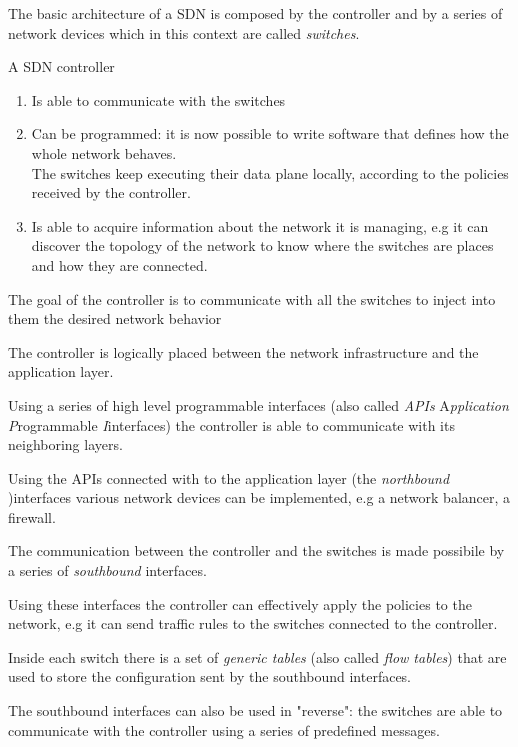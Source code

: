 \documentclass{report}
\begin{document}
	The basic architecture of a SDN is composed by the controller and by a series of network devices which in this context are called \textit{switches}.
	
	
	A SDN controller
	
	\begin{enumerate}
		\item Is able to communicate with the switches
		\item Can be programmed: it is now possible to write software that defines how the whole network behaves. \\
		The switches keep executing their data plane locally, according to the policies received by the controller.
		\item Is able to acquire information about the network it is managing, e.g it can discover the topology of the network to know where the switches are places and how they are connected.
	\end{enumerate}
	
	The goal of the controller is to communicate with all the switches to inject into them the desired network behavior
	
	The controller is logically placed between the network infrastructure and the application layer.
	
	Using a series of high level programmable interfaces  (also called \textit{APIs} A\textit{pplication} \textit{P}rogrammable \textit{I}interfaces) the controller is able to communicate with its neighboring layers.
	
	
	Using the APIs connected with to the application layer (the \textit{northbound })interfaces various network devices can be implemented, e.g a network balancer, a firewall.
	
	The communication between the controller and the switches is made possibile by a series of \textit{southbound} interfaces.
	
	Using these interfaces the controller can effectively apply the policies to the network, e.g it can send traffic rules to the switches connected to the controller.
	
	Inside each switch there is a set of \textit{generic tables} (also called \textit{flow tables}) that are used to store the configuration sent by the southbound interfaces.
	
	The southbound interfaces can also be used in "reverse": the switches are able to communicate with the controller using a series of predefined messages.
	
	
	
\end{document}
